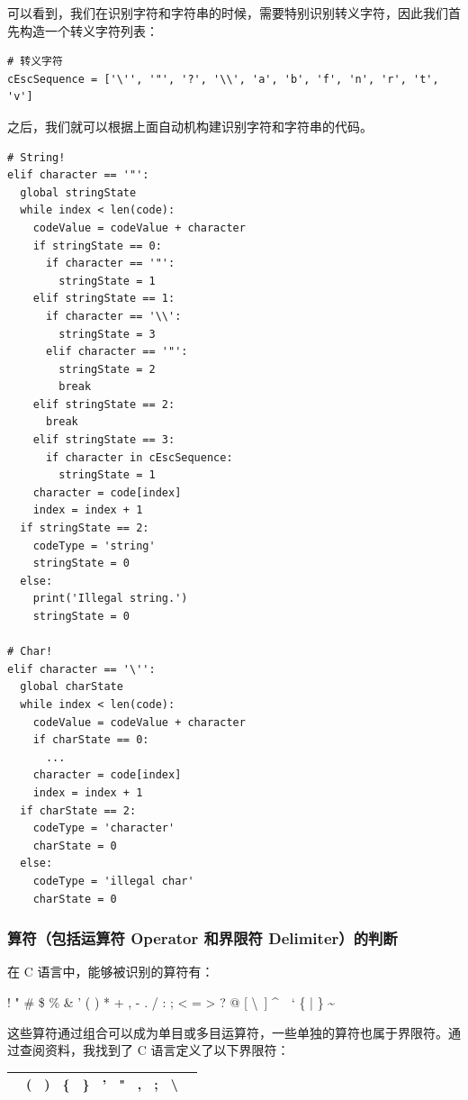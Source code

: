 \documentclass[UTF8]{ctexart}
\begin{document}
可以看到，我们在识别字符和字符串的时候，需要特别识别转义字符，因此我们首先构造一个转义字符列表：

\begin{verbatim}
# 转义字符
cEscSequence = ['\'', '"', '?', '\\', 'a', 'b', 'f', 'n', 'r', 't', 'v']
\end{verbatim}

之后，我们就可以根据上面自动机构建识别字符和字符串的代码。

\begin{verbatim}
# String!
elif character == '"':
  global stringState
  while index < len(code):
    codeValue = codeValue + character
    if stringState == 0:
      if character == '"':
        stringState = 1
    elif stringState == 1:
      if character == '\\':
        stringState = 3
      elif character == '"':
        stringState = 2
        break
    elif stringState == 2:
      break
    elif stringState == 3:
      if character in cEscSequence:
        stringState = 1
    character = code[index]
    index = index + 1
  if stringState == 2:
    codeType = 'string'
    stringState = 0
  else:
    print('Illegal string.')
    stringState = 0

# Char!
elif character == '\'':
  global charState
  while index < len(code):
    codeValue = codeValue + character
    if charState == 0:
      ...
    character = code[index]
    index = index + 1
  if charState == 2:
    codeType = 'character'
    charState = 0
  else:
    codeType = 'illegal char'
    charState = 0
\end{verbatim}

\subsubsection{算符（包括运算符 Operator 和界限符 Delimiter）的判断}
在 C 语言中，能够被识别的算符有：

\begin{center}
  ! " \# \$ \% \& ' ( ) * + , - . / : ; < = > ? @ [ \textbackslash\ ] \textasciicircum\ \textunderscore \ ` \{ | \} \textasciitilde
\end{center}

这些算符通过组合可以成为单目或多目运算符，一些单独的算符也属于界限符。通过查阅资料，我找到了 C 语言定义了以下界限符：

\begin{center}
  \captionsetup{position=above}
  \begin{tabular}{|c c c c c c c c c c c|}
    \hline
    [ & ] & ( & ) & \{ & \} & ' & " & , & ; & \textbackslash \\
    \hline
  \end{tabular}
\end{center}
\end{document}
